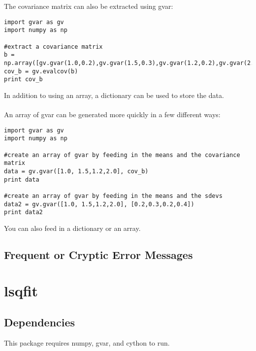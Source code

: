 \documentclass[english,course,headertitle,theoremsection,nocleardoublepage,twoside,onecolumn]{Notes}
\begin{document}
The covariance matrix can also be extracted using gvar:
\begin{lstlisting}
import gvar as gv
import numpy as np

#extract a covariance matrix
b = np.array([gv.gvar(1.0,0.2),gv.gvar(1.5,0.3),gv.gvar(1.2,0.2),gv.gvar(2.0,0.4)])
cov_b = gv.evalcov(b)
print cov_b
\end{lstlisting}
In addition to using an array, a dictionary can be used to store the data.\\
\\
An array of gvar can be generated more quickly in a few different ways:
\begin{lstlisting}
import gvar as gv
import numpy as np

#create an array of gvar by feeding in the means and the covariance matrix
data = gv.gvar([1.0, 1.5,1.2,2.0], cov_b)
print data

#create an array of gvar by feeding in the means and the sdevs
data2 = gv.gvar([1.0, 1.5,1.2,2.0], [0.2,0.3,0.2,0.4])
print data2
\end{lstlisting}


You can also feed in a dictionary or an array.
\subsection{Frequent or Cryptic Error Messages}

\section{lsqfit}
\subsection{Dependencies}
This package requires numpy, gvar, and cython to run.
\end{document}

